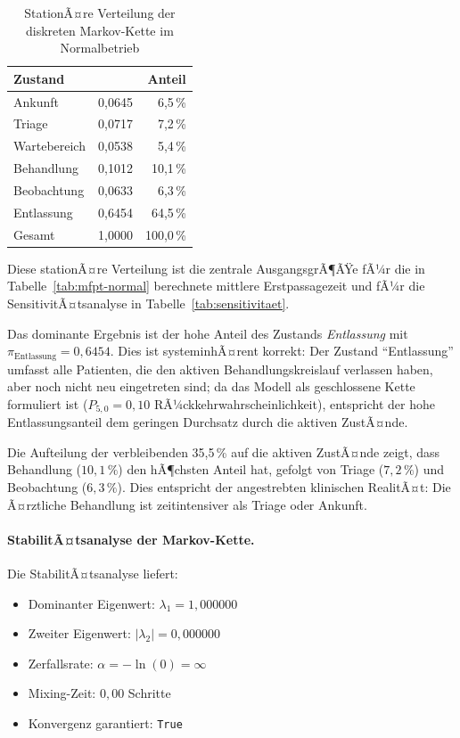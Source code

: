 ﻿\documentclass[a4paper,12pt]{report}
\theoremstyle{definition}
\begin{document}
\begin{table}[H]
	\centering
	\begin{tabular}{@{}lrr@{}}
		\toprule
		\textbf{Zustand} & \boldmath{$\pi_i$} & \textbf{Anteil} \\
		\midrule
		Ankunft     & 0{,}0645 &  6{,}5\,\% \\
		Triage      & 0{,}0717 &  7{,}2\,\% \\
		Wartebereich& 0{,}0538 &  5{,}4\,\% \\
		Behandlung  & 0{,}1012 & 10{,}1\,\% \\
		Beobachtung & 0{,}0633 &  6{,}3\,\% \\
		Entlassung  & 0{,}6454 & 64{,}5\,\% \\
		\midrule
		Gesamt      & 1{,}0000 & 100{,}0\,\% \\
		\bottomrule
	\end{tabular}
	\caption{StationÃ¤re Verteilung der diskreten Markov-Kette im Normalbetrieb}
\label{tab:stationaer-normal}
	\label{tab:pi-normal}
\end{table}

Diese stationÃ¤re Verteilung ist die zentrale AusgangsgrÃ¶ÃŸe fÃ¼r die in Tabelle~\ref{tab:mfpt-normal} berechnete mittlere Erstpassagezeit und fÃ¼r die SensitivitÃ¤tsanalyse in Tabelle~\ref{tab:sensitivitaet}.

Das dominante Ergebnis ist der hohe Anteil des Zustands \emph{Entlassung}
mit $\pi_\text{Entlassung} = 0{,}6454$. Dies ist systeminhÃ¤rent korrekt:
Der Zustand ``Entlassung'' umfasst alle Patienten, die den aktiven
Behandlungskreislauf verlassen haben, aber noch nicht neu eingetreten sind;
da das Modell als geschlossene Kette formuliert ist ($P_{5,0} = 0{,}10$
RÃ¼ckkehrwahrscheinlichkeit), entspricht der hohe Entlassungsanteil
dem geringen Durchsatz durch die aktiven ZustÃ¤nde.

Die Aufteilung der verbleibenden 35{,}5\,\% auf die aktiven ZustÃ¤nde
zeigt, dass Behandlung ($10{,}1\,\%$) den hÃ¶chsten Anteil hat, gefolgt
von Triage ($7{,}2\,\%$) und Beobachtung ($6{,}3\,\%$). Dies entspricht
der angestrebten klinischen RealitÃ¤t: Die Ã¤rztliche Behandlung ist
zeitintensiver als Triage oder Ankunft.

\paragraph{StabilitÃ¤tsanalyse der Markov-Kette.}
Die StabilitÃ¤tsanalyse liefert:
\begin{itemize}
	\item[-] Dominanter Eigenwert: $\lambda_1 = 1{,}000000$
	\item[-] Zweiter Eigenwert: $|\lambda_2| = 0{,}000000$
	\item[-] Zerfallsrate: $\alpha = -\ln(0) = \infty$
	\item[-] Mixing-Zeit: $0{,}00$ Schritte
	\item[-] Konvergenz garantiert: \texttt{True}
\end{itemize}
\end{document}
